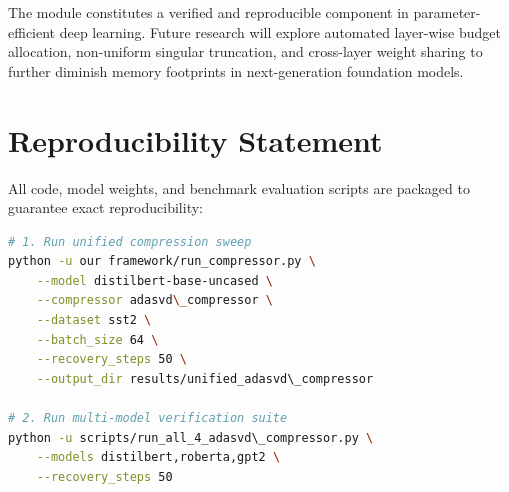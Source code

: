 \documentclass{article}
\begin{document}
The module constitutes a verified and reproducible component in parameter-efficient deep learning. Future research will explore automated layer-wise budget allocation, non-uniform singular truncation, and cross-layer weight sharing to further diminish memory footprints in next-generation foundation models.


\section{Reproducibility Statement}
All code, model weights, and benchmark evaluation scripts are packaged to guarantee exact reproducibility:
\begin{lstlisting}[language=bash]
# 1. Run unified compression sweep
python -u our framework/run_compressor.py \
    --model distilbert-base-uncased \
    --compressor adasvd\_compressor \
    --dataset sst2 \
    --batch_size 64 \
    --recovery_steps 50 \
    --output_dir results/unified_adasvd\_compressor

# 2. Run multi-model verification suite
python -u scripts/run_all_4_adasvd\_compressor.py \
    --models distilbert,roberta,gpt2 \
    --recovery_steps 50
\end{lstlisting}
\end{document}
